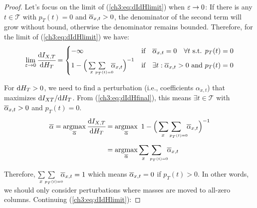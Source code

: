 \begin{proof}
Let's focus on the limit of (\ref{ch3:eq:dIdHlimit}) when $\varepsilon\to 0$: If there is any $t\in\mathcal{T}$ with $p_T(t)=0$ and \mbox{$\overline{\alpha}_{x, t}>0$}, the denominator of the second term will grow without bound, otherwise the denominator remains bounded.  Therefore, for the limit of  (\ref{ch3:eq:dIdHlimit})  we have:
\begin{equation}
    \limdp \cfrac{\dif{I_{X,T}}}{\dif{H_T}} 
    =\begin{cases}
        -\infty & \text{if} \hspace{10pt} \abar_{x,t} = 0 \hspace{10pt} \forall t \text{ s.t. }  p_T(t)=0 \\[3pt]
        1-\Big(\doublesum{x}{\ \ p_T(t)=0}\ \abar_{x, t} \Big)^{-1} & \text{if} \hspace{10pt} \exists t: \abar_{x,t}>0 \text{ and } p_T(t)=0 
    \end{cases} \label{ch3:eq:dIdHfinal}
\end{equation}

For $ \text{d}{H_T}>0 $, we need to find a perturbation (i.e., coefficients $ \alpha_{x,t} $) that maximizes $ \text{d}{I_{XT}} / \text{d}{H_T} $. From (\ref{ch3:eq:dIdHfinal}), this means $\exists t\in\mathcal{T}$ with $\overline{\alpha}_{x,t}>0$ and $p_T(t)=0$.
\begin{align*}
    \abar 
    = \argmax_{\abar} \cfrac{\dif{I_{X,T}}}{\dif{H_T}}
    &= \argmax_{\abar} \ 1-\Big(\doublesum{x}{\ \ p_T(t)=0}\ \abar_{x, t} \Big)^{-1} \\[5pt]
    &= \argmax_{\abar} \doublesum{x}{\ \ p_T(t)=0}\ \abar_{x, t} 
\end{align*}

Therefore, $\doublesum{x}{\ \ p_T(t)=0}\ \abar_{x, t}=1$ which means $\overline{\alpha}_{x, t}=0$ if $p_T(t)>0$. In other words, we should only consider perturbations where masses are moved to all-zero columns. Continuing (\ref{ch3:eq:dIdHlimit}):


\end{proof}
